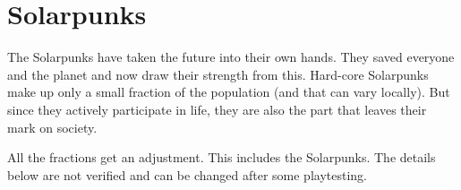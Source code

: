 \section{Solarpunks}

The Solarpunks have taken the future into their own hands. They saved everyone and the planet and now draw their strength from this.
Hard-core Solarpunks make up only a small fraction of the population (and that can vary locally). But since they actively participate in life, they are also the part that leaves their mark on society.

\begin{warning}
    All the fractions get an adjustment. This includes the Solarpunks. The details below are not verified and can be changed after some playtesting.

\end{warning}

